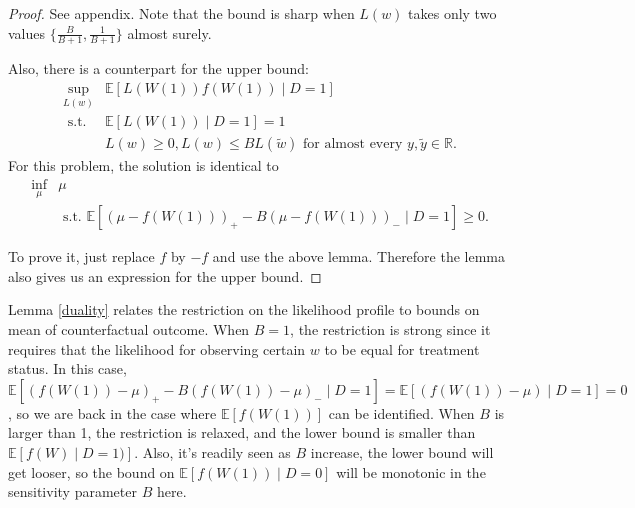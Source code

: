 \documentclass[12pt]{article}
\newcommand{\Ep}{\mathbb{E}}
\begin{document}
	\begin{proof}
		See appendix. Note that the bound is sharp when $L(w)$
		takes only two values $\{\frac{B}{B + 1}, \frac{1}{B + 1}\}$ almost surely.
		
		Also, there is a counterpart for the upper bound:
		\begin{equation*}
		\begin{array}{ll}
		\sup _{L(w)} & \mathbb{E}[L(W(1))f(W(1)) \mid D=1] \\
		\text { s.t. } & \mathbb{E}[L(W(1)) \mid D=1]=1 \\
		& L(w) \geq 0, L(w) \leq B L(\tilde{w}) \text { for almost every } y, \tilde{y} \in \mathbb{R}.
		\end{array}
		\end{equation*}
		For this problem, the solution is identical to \begin{equation*}
		\begin{array}{ll}
		\inf _{\mu} & \mu \\
		& \text { s.t. }  \mathbb{E}\left[(\mu-f(W(1)))_{+}-B(\mu-f(W(1)))_{-} \mid D=1\right] \geq 0.
		\end{array}
		\end{equation*}
		
		To prove it, just replace $f$ by $-f$ and use the above lemma. Therefore the lemma also gives us an expression for the upper bound.
	\end{proof}
	
	Lemma \ref{duality} relates the restriction on the likelihood profile to bounds on mean of counterfactual outcome. When $B = 1$, the restriction is strong since it requires that the likelihood for observing certain $w$ to be equal for treatment status. In this case, $\mathbb{E}\left[(f(W(1))-\mu)_{+}-B(f(W(1))-\mu)_{-} \mid D=1\right] = \mathbb{E}\left[(f(W(1))-\mu) \mid D=1\right] = 0$, so we are back in the case where $\Ep[f(W(1))]$ can be identified. When $B$ is larger than 1, the restriction is relaxed, and the lower bound is smaller than $\Ep[f(W) \mid D = 1)]$. Also, it's readily seen as $B$ increase, the lower bound will get looser, so the bound on $\Ep[f(W(1)) \mid D = 0]$ will be monotonic in the sensitivity parameter $B$ here. 
\end{document}
